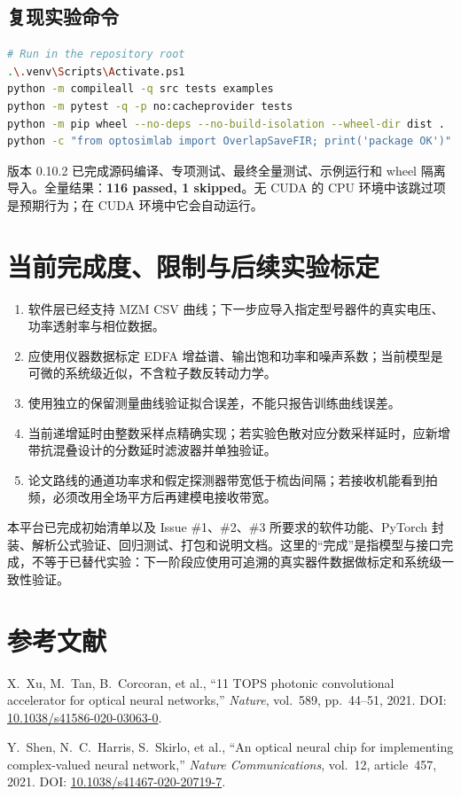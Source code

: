 \documentclass[11pt,a4paper,UTF8]{ctexart}
\begin{document}
\subsection{复现实验命令}
\begin{lstlisting}[language=bash]
# Run in the repository root
.\.venv\Scripts\Activate.ps1
python -m compileall -q src tests examples
python -m pytest -q -p no:cacheprovider tests
python -m pip wheel --no-deps --no-build-isolation --wheel-dir dist .
python -c "from optosimlab import OverlapSaveFIR; print('package OK')"
\end{lstlisting}
\begin{tcolorbox}[colback=lightblue,colframe=teal,title=当前验收结果]
版本 0.10.2 已完成源码编译、专项测试、最终全量测试、示例运行和 wheel 隔离导入。全量结果：\textbf{116 passed, 1 skipped}。无 CUDA 的 CPU 环境中该跳过项是预期行为；在 CUDA 环境中它会自动运行。
\end{tcolorbox}

\section{当前完成度、限制与后续实验标定}
\begin{enumerate}
\item 软件层已经支持 MZM CSV 曲线；下一步应导入指定型号器件的真实电压、功率透射率与相位数据。
\item 应使用仪器数据标定 EDFA 增益谱、输出饱和功率和噪声系数；当前模型是可微的系统级近似，不含粒子数反转动力学。
\item 使用独立的保留测量曲线验证拟合误差，不能只报告训练曲线误差。
\item 当前递增延时由整数采样点精确实现；若实验色散对应分数采样延时，应新增带抗混叠设计的分数延时滤波器并单独验证。
\item 论文路线的通道功率求和假定探测器带宽低于梳齿间隔；若接收机能看到拍频，必须改用全场平方后再建模电接收带宽。
\end{enumerate}
\begin{tcolorbox}[colback=lightblue,colframe=teal,title=结论]
本平台已完成初始清单以及 Issue \#1、\#2、\#3 所要求的软件功能、PyTorch 封装、解析公式验证、回归测试、打包和说明文档。这里的“完成”是指模型与接口完成，不等于已替代实验：下一阶段应使用可追溯的真实器件数据做标定和系统级一致性验证。
\end{tcolorbox}

\section{参考文献}
X.~Xu, M.~Tan, B.~Corcoran, et al., ``11 TOPS photonic convolutional accelerator for optical neural networks,'' \textit{Nature}, vol.~589, pp.~44--51, 2021. DOI: \href{https://doi.org/10.1038/s41586-020-03063-0}{10.1038/s41586-020-03063-0}.

Y.~Shen, N.~C.~Harris, S.~Skirlo, et al., ``An optical neural chip for implementing complex-valued neural network,'' \textit{Nature Communications}, vol.~12, article~457, 2021. DOI: \href{https://doi.org/10.1038/s41467-020-20719-7}{10.1038/s41467-020-20719-7}.
\end{document}

